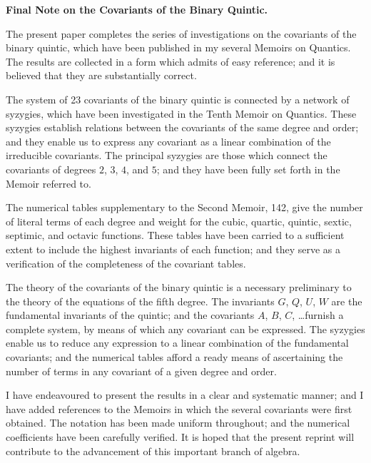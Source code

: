 \documentclass[11pt,a4paper]{book}
\begin{document}
\clearpage
\setcounter{page}{309}

\begin{center}
\textbf{Final Note on the Covariants of the Binary Quintic.}
\end{center}

The present paper completes the series of investigations on the covariants of the binary quintic, which have been published in my several Memoirs on Quantics. The results are collected in a form which admits of easy reference; and it is believed that they are substantially correct.

The system of 23 covariants of the binary quintic is connected by a network of syzygies, which have been investigated in the Tenth Memoir on Quantics. These syzygies establish relations between the covariants of the same degree and order; and they enable us to express any covariant as a linear combination of the irreducible covariants. The principal syzygies are those which connect the covariants of degrees $2$, $3$, $4$, and $5$; and they have been fully set forth in the Memoir referred to.

The numerical tables supplementary to the Second Memoir, 142, give the number of literal terms of each degree and weight for the cubic, quartic, quintic, sextic, septimic, and octavic functions. These tables have been carried to a sufficient extent to include the highest invariants of each function; and they serve as a verification of the completeness of the covariant tables.

\clearpage
\setcounter{page}{310}

The theory of the covariants of the binary quintic is a necessary preliminary to the theory of the equations of the fifth degree. The invariants $G$, $Q$, $U$, $W$ are the fundamental invariants of the quintic; and the covariants $A$, $B$, $C$, \ldots furnish a complete system, by means of which any covariant can be expressed. The syzygies enable us to reduce any expression to a linear combination of the fundamental covariants; and the numerical tables afford a ready means of ascertaining the number of terms in any covariant of a given degree and order.

I have endeavoured to present the results in a clear and systematic manner; and I have added references to the Memoirs in which the several covariants were first obtained. The notation has been made uniform throughout; and the numerical coefficients have been carefully verified. It is hoped that the present reprint will contribute to the advancement of this important branch of algebra.
\end{document}
